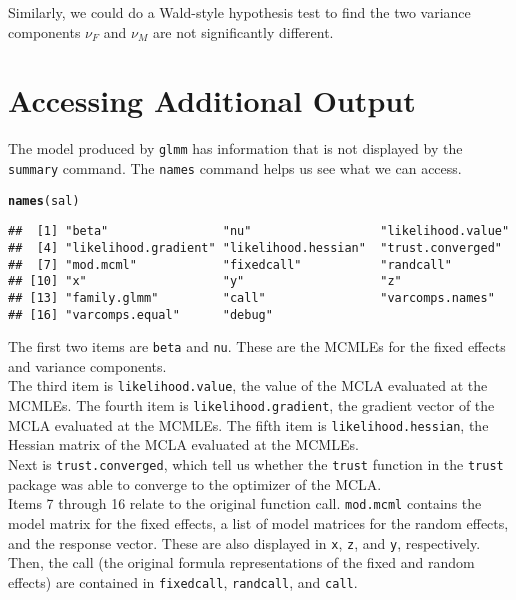 \documentclass[11pt]{article}\usepackage[]{graphicx}\usepackage[]{color}
\makeatletter
\newcommand{\hlstd}[1]{\textcolor[rgb]{0.345,0.345,0.345}{#1}}%
\newcommand{\hlkwd}[1]{\textcolor[rgb]{0.737,0.353,0.396}{\textbf{#1}}}%
\newenvironment{kframe}{%
 \def\at@end@of@kframe{}%
 \ifinner\ifhmode%
  \def\at@end@of@kframe{\end{minipage}}%
  \begin{minipage}{\columnwidth}%
 \fi\fi%
 \def\FrameCommand##1{\hskip\@totalleftmargin \hskip-\fboxsep
 \colorbox{shadecolor}{##1}\hskip-\fboxsep
     \hskip-\linewidth \hskip-\@totalleftmargin \hskip\columnwidth}%
 \MakeFramed {\advance\hsize-\width
   \@totalleftmargin\z@ \linewidth\hsize
   \@setminipage}}%
 {\par\unskip\endMakeFramed%
 \at@end@of@kframe}
\newenvironment{knitrout}{}{} %
\makeatother
\begin{document}
Similarly, we could do a Wald-style hypothesis test to find the two variance components $\nu_F$ and $\nu_M$ are not significantly different.

\section{Accessing Additional Output}\label{sec:otherstuff}
The model produced by \texttt{glmm} has information that is not displayed by the \texttt{summary} command. The \texttt{names} command helps us see what we can access.
\begin{knitrout}
\color{fgcolor}\begin{kframe}
\begin{alltt}
\hlkwd{names}\hlstd{(sal)}
\end{alltt}
\begin{verbatim}
##  [1] "beta"                "nu"                  "likelihood.value"   
##  [4] "likelihood.gradient" "likelihood.hessian"  "trust.converged"    
##  [7] "mod.mcml"            "fixedcall"           "randcall"           
## [10] "x"                   "y"                   "z"                  
## [13] "family.glmm"         "call"                "varcomps.names"     
## [16] "varcomps.equal"      "debug"
\end{verbatim}
\end{kframe}
\end{knitrout}
The first two items are \texttt{beta} and \texttt{nu}. These are the MCMLEs for the fixed effects and variance components. \\

The third item is \texttt{likelihood.value}, the value of the MCLA evaluated at the MCMLEs. The fourth item is  \texttt{likelihood.gradient}, the gradient vector of the MCLA evaluated at the MCMLEs.  The fifth item is  \texttt{likelihood.hessian}, the Hessian matrix of the MCLA evaluated at the MCMLEs.\\

Next is \texttt{trust.converged}, which tell us whether the \texttt{trust} function in the \texttt{trust} package was able to converge to the optimizer of the MCLA.\\

Items 7 through 16 relate to the original function call. \texttt{mod.mcml} contains the model matrix for the fixed effects, a list of model matrices for the random effects, and the response vector. These are also displayed in \texttt{x}, \texttt{z}, and \texttt{y}, respectively. Then, the call (the original formula representations of the fixed and random effects) are contained in \texttt{fixedcall}, \texttt{randcall}, and \texttt{call}.\\
\end{document}
